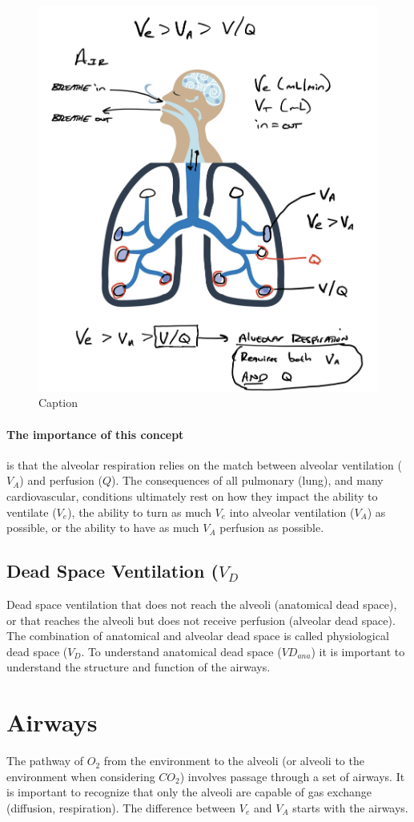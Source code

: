 \begin{figure}
    \centering
    \includegraphics[width = 0.5\linewidth]{./figure/ve_va.jpg}
    \caption{Caption}
    \label{fig:ve_va.jpg}
\end{figure}

\paragraph{The importance of this concept} is that the alveolar respiration relies on the match between alveolar ventilation ($V_A$) and perfusion ($Q$). The consequences of all pulmonary (lung), and many cardiovascular, conditions ultimately rest on how they impact the ability to ventilate ($V_e$), the ability to turn as much $V_e$ into alveolar ventilation ($V_A$) as possible, or the ability to have as much $V_A$ perfusion as possible.

\subsection{Dead Space Ventilation ($V_D$}
Dead space ventilation that does not reach the alveoli (anatomical dead space), or that reaches the alveoli but does not receive perfusion (alveolar dead space). The combination of anatomical and alveolar dead space is called physiological dead space ($V_D$. To understand anatomical dead space ($VD_{ana}$) it is important to understand the structure and function of the airways.

\section{Airways}

The pathway of $O_2$ from the environment to the alveoli (or alveoli to the environment when considering $CO_2$) involves passage through a set of airways. It is important to recognize that only the alveoli are capable of gas exchange (diffusion, respiration). The difference between $V_e$ and $V_A$ starts with the airways.  

